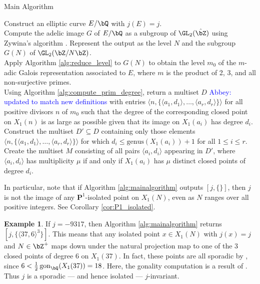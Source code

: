 \documentclass[11pt,reqno]{amsart}
\theoremstyle{plain}
\theoremstyle{definition}
\newtheorem{example}[theorem]{Example}
\DeclareMathOperator{\gon}{gon}
\newcommand{\Q}{\bQ}
\newcommand{\Z}{\bZ}
\newcommand{\abbey}[1]{\textcolor{blue}{Abbey: #1}}
\begin{document}
\setcounter{algocf}{0}
\begin{algorithm}[h!]
\caption{Main Algorithm}\label{alg:mainalgorithm}
\KwIn{A non-CM $j$-invariant $j \in \Q$.}
Construct an elliptic curve $E/\Q$ with $j(E)=j$.\\
Compute the adelic image $G$ of $E/\Q$ as a subgroup of $\GL_2(\hat{\Z})$ using Zywina's algorithm \cite{ZywinaAlgorithm}. Represent the output as the level $N$ and the subgroup $G(N)$ of $\GL_2(\Z/N\Z)$.\\
Apply Algorithm \ref{alg:reduce_level} to $G(N)$ to obtain the level $m_0$ of the $m$-adic Galois representation associated to $E$, where $m$ is the product of 2, 3, and all non-surjective primes.\\
Using Algorithm \ref{alg:compute_prim_degree}, return a multiset $D$ \abbey{updated to match new definitions} with entries $\langle n, \{\langle a_1, d_1\rangle ,  \dots,  \langle a_r, d_r\rangle \} \rangle$
    for all positive divisors $n$ of $m_0$ such that the degree of the corresponding
    closed point on $X_1(n)$ is as large as possible given that its image on $X_1(a_i) $
    has degree $d_i$.\\
Construct the multiset $D' \subseteq D$ containing only those elements $\langle n, \{\langle a_1, d_1\rangle ,  \dots,  \langle a_r, d_r\rangle \} \rangle$ for which $d_i \leq \text{genus}(X_1(a_i))+1$ for all $1 \leq i \leq r$.\\
Create the multiset $M$ consisting of all pairs $\langle a_i,d_i\rangle $ appearing in $D'$, where $\langle a_i,d_i\rangle $ has multiplicity $\mu$ if and only if $X_1(a_i)$ has $\mu$ distinct closed points of degree $d_i$.\\
\Return{$[j,M]$}

\end{algorithm}

In particular, note that if Algorithm \ref{alg:mainalgorithm} outputs $[j,\{\}]$, then $j$ is not the image of any $\mathbf{P}^1$-isolated point on $X_1(N)$, even as $N$ ranges over all positive integers. See Corollary \ref{cor:P1_isolated}.

\begin{example}
If $j=-9317$, then Algorithm \ref{alg:mainalgorithm} returns $[j, \{\langle 37,6\rangle ^3\}]$. This means that any isolated point $x\in X_1(N)$ with $j(x)=j$ and $N \in \Z^+$ maps down under the natural projection map to one of the 3 closed points of degree 6 on $X_1(37)$. In fact, these points are all sporadic by \cite[Proposition 2]{frey}, since $6 < \frac{1}{2} \gon_{\Q}(X_1(37)) = 18$. Here, the gonality computation is a result of \cite{DerickxVanHoeij2014}. Thus $j$ is a sporadic --- and hence isolated --- $j$-invariant.
\end{example}
\end{document}
